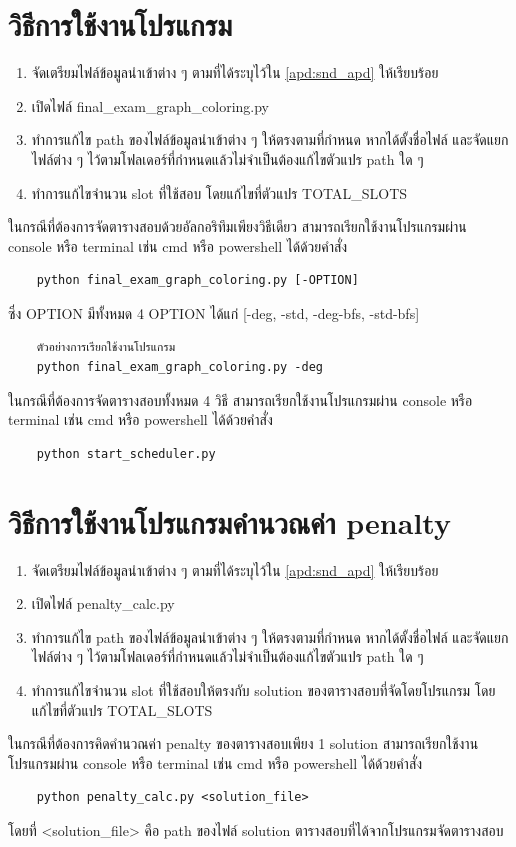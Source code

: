\section{วิธีการใช้งานโปรแกรม}
\begin{enumerate}
    \item จัดเตรียมไฟล์ข้อมูลนำเข้าต่าง ๆ ตามที่ได้ระบุไว้ใน \ref{apd:snd_apd} ให้เรียบร้อย
    \item เปิดไฟล์ final\_exam\_graph\_coloring.py
    \item ทำการแก้ไข path ของไฟล์ข้อมูลนำเข้าต่าง ๆ ให้ตรงตามที่กำหนด หากได้ตั้งชื่อไฟล์ และจัดแยกไฟล์ต่าง ๆ ไว้ตามโฟลเดอร์ที่กำหนดแล้วไม่จำเป็นต้องแก้ไขตัวแปร path ใด ๆ
    \item ทำการแก้ไขจำนวน slot ที่ใช้สอบ โดยแก้ไขที่ตัวแปร TOTAL\_SLOTS
\end{enumerate}
ในกรณีที่ต้องการจัดตารางสอบด้วยอัลกอริทึมเพียงวิธีเดียว สามารถเรียกใช้งานโปรแกรมผ่าน console หรือ terminal เช่น cmd หรือ powershell ได้ด้วยคำสั่ง 
\begin{verbatim}
    python final_exam_graph_coloring.py [-OPTION]
\end{verbatim}
ซึ่ง OPTION มีทั้งหมด 4 OPTION ได้แก่ [-deg, -std, -deg-bfs, -std-bfs]

\begin{verbatim}
    ตัวอย่างการเรียกใช้งานโปรแกรม
    python final_exam_graph_coloring.py -deg
\end{verbatim}

\noindent ในกรณีที่ต้องการจัดตารางสอบทั้งหมด 4 วิธี สามารถเรียกใช้งานโปรแกรมผ่าน console หรือ terminal เช่น cmd หรือ powershell ได้ด้วยคำสั่ง
\begin{verbatim}
    python start_scheduler.py
\end{verbatim}
\section{วิธีการใช้งานโปรแกรมคำนวณค่า penalty}
\begin{enumerate}
    \item จัดเตรียมไฟล์ข้อมูลนำเข้าต่าง ๆ ตามที่ได้ระบุไว้ใน \ref{apd:snd_apd} ให้เรียบร้อย
    \item เปิดไฟล์ penalty\_calc.py
    \item ทำการแก้ไข path ของไฟล์ข้อมูลนำเข้าต่าง ๆ ให้ตรงตามที่กำหนด หากได้ตั้งชื่อไฟล์ และจัดแยกไฟล์ต่าง ๆ ไว้ตามโฟลเดอร์ที่กำหนดแล้วไม่จำเป็นต้องแก้ไขตัวแปร path ใด ๆ
    \item ทำการแก้ไขจำนวน slot ที่ใช้สอบให้ตรงกับ solution ของตารางสอบที่จัดโดยโปรแกรม โดยแก้ไขที่ตัวแปร TOTAL\_SLOTS
\end{enumerate}
ในกรณีที่ต้องการคิดคำนวณค่า penalty ของตารางสอบเพียง 1 solution สามารถเรียกใช้งานโปรแกรมผ่าน console หรือ terminal เช่น cmd หรือ powershell ได้ด้วยคำสั่ง 
\begin{verbatim}
    python penalty_calc.py <solution_file>
\end{verbatim}
โดยที่ <solution\_file> คือ path ของไฟล์ solution ตารางสอบที่ได้จากโปรแกรมจัดตารางสอบ

